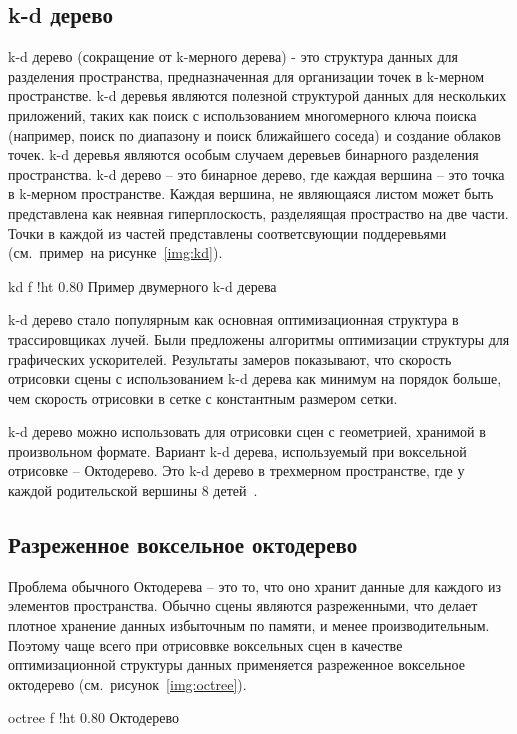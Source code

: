 \subsection{k-d дерево}

k-d дерево (сокращение от k-мерного дерева) - это структура данных 
для разделения пространства, предназначенная для организации точек в 
k-мерном пространстве. k-d деревья являются полезной структурой данных 
для нескольких приложений, таких как поиск с использованием многомерного 
ключа поиска (например, поиск по диапазону и поиск ближайшего соседа) и 
создание облаков точек. k-d деревья являются особым случаем деревьев 
бинарного разделения пространства. k-d дерево -- это бинарное дерево, где каждая 
вершина -- это точка в k-мерном пространстве. Каждая вершина, не являющаяся листом 
может быть представлена как неявная гиперплоскость, разделяящая простраство на две части.
Точки в каждой из частей представлены соответсвующии поддеревьями (см.~пример~на
рисунке~\ref{img:kd}).

    {kd}
    {f}
    {!ht}
    {0.80\textwidth}
    {Пример двумерного k-d дерева}

k-d дерево стало популярным как основная оптимизационная структура в 
трассировщиках лучей. Были предложены алгоритмы оптимизации структуры для графических
ускорителей. Результаты замеров показывают, что скорость отрисовки сцены с использованием
k-d дерева как минимум на порядок больше, чем скорость отрисовки в сетке с константным 
размером сетки.

k-d дерево можно использовать для отрисовки сцен с геометрией, хранимой в произвольном 
формате. Вариант k-d дерева, используемый при воксельной отрисовке -- Октодерево. Это k-d дерево в трехмерном пространстве, где у каждой родительской вершины 8 детей~\cite{KDTASfaGR}.

\subsection{Разреженное воксельное октодерево}

Проблема обычного Октодерева -- это то, что оно хранит данные для каждого из элементов 
пространства. Обычно сцены являются разреженными, что делает плотное хранение данных
избыточным по памяти, и менее производительным. Поэтому чаще всего при отрисоввке
воксельных сцен в качестве оптимизационной структуры данных применяется разреженное воксельное
октодерево (см.~рисунок~\ref{img:octree}).

    {octree}
    {f}
    {!ht}
    {0.80\textwidth}
    {Октодерево}

